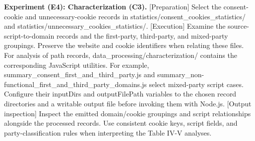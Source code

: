 \documentclass[conference]{IEEEtran}
\begin{document}
\noindent\textbf{Experiment (E4): Characterization (C3).} [Preparation] Select the consent-cookie and unnecessary-cookie records in statistics/consent\_cookies\_statistics/ and statistics/unnecessary\_cookies\_statistics/. [Execution] Examine the source-script-to-domain records and the first-party, third-party, and mixed-party groupings. Preserve the website and cookie identifiers when relating these files. For analysis of path records, data\_processing/characterization/ contains the corresponding JavaScript utilities. For example, summary\_consent\_first\_and\_third\_party.js and summary\_non-functional\_first\_and\_third\_party\_domains.js select mixed-party script cases. Configure their inputDirs and outputFilePath variables to the chosen record directories and a writable output file before invoking them with Node.js. [Output inspection] Inspect the emitted domain/cookie groupings and script relationships alongside the processed records. Use consistent cookie keys, script fields, and party-classification rules when interpreting the Table IV-V analyses.
\end{document}
